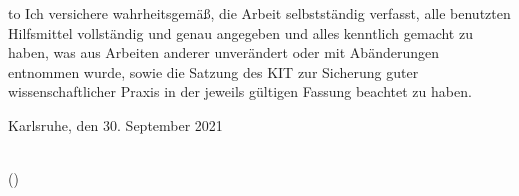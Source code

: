 
\thispagestyle{empty}
\null\vfill
\noindent\hbox to \textwidth{\hrulefill} 
%
{Ich versichere wahrheitsgemäß, die Arbeit selbstständig verfasst, alle benutzten Hilfsmittel
vollständig und genau angegeben und alles kenntlich gemacht zu haben, was aus
Arbeiten anderer unverändert oder mit Abänderungen entnommen wurde, sowie die
Satzung des KIT zur Sicherung guter wissenschaftlicher Praxis in der jeweils gültigen
Fassung beachtet zu haben.}
 
 

\vspace{1.5cm}
Karlsruhe, den 30. September 2021
\vspace{1.5cm}
 
\dotfill\hspace*{9.45cm}\\
\hspace*{2cm}(\theauthor) 
\cleardoublepage